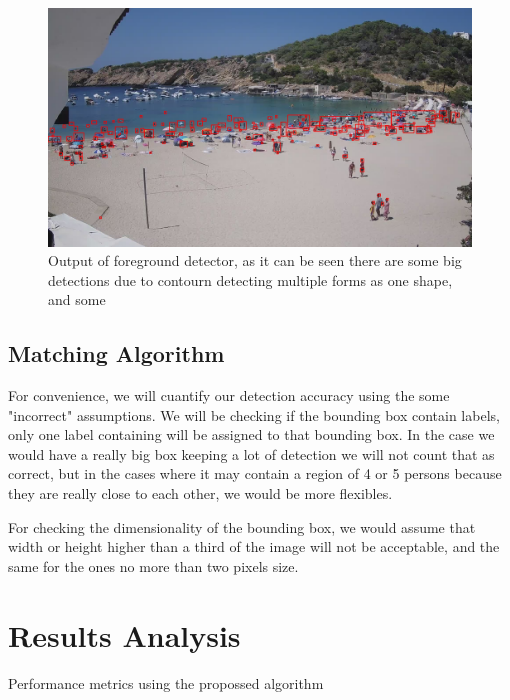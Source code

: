 \documentclass[10pt]{article}
\begin{document}
\begin{figure}
    \centering
    \includegraphics[width=\textwidth]{img/det_name.jpg}
    \caption{Output of foreground detector, as it can be seen there are some big detections due to contourn detecting multiple forms as one shape, and some }
    \label{fig:detections}
\end{figure}

\subsection{Matching Algorithm}
For convenience, we will cuantify our detection accuracy using the some "incorrect" assumptions. We will be checking if the bounding box contain labels, only one label containing will be assigned to that bounding box. In the case we would have a really big box keeping a lot of detection we will not count that as correct, but in the cases where it may contain a region of 4 or 5 persons because they are really close to each other, we would be more flexibles.\newline

For checking the dimensionality of the bounding box, we would assume that width or height higher than a third of the image will not be acceptable, and the same for the ones no more than two pixels size. 

\section{Results Analysis}

\begin{table} [hp]
    \centering
    \caption[Performance metrics Basic]{Performance metrics using the propossed algorithm}\label{table:metrics}
\end{table}
\end{document}
